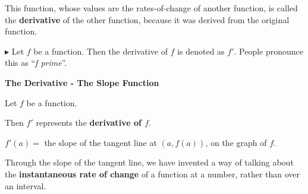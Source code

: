 \documentclass{ximera}
\begin{document}
This function, whose values are the rates-of-change of another function, is called the \textbf{derivative} of the other function, because it was derived from the original function.




$\blacktriangleright$ Let $f$ be a function.  Then the derivative of $f$ is denoted as $f'$. People pronounce this as ``\textit{f prime}''. 



\begin{definition} \textbf{\textcolor{green!50!black}{The Derivative - The Slope Function}} 

Let $f$ be a function.

Then $f'$ represents the \textbf{derivative of $f$}.


$f'(a) = $ the slope of the tangent line at $(a, f(a))$, on the graph of $f$.




\end{definition}



Through the slope of the tangent line, we have invented a way of talking about the \textbf{\textcolor{purple!85!blue}{instantaneous rate of change}} of a function at a number, rather than over an interval. \\
\end{document}
